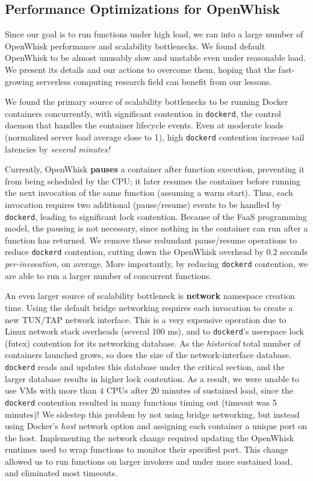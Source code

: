 \subsection{Performance Optimizations for OpenWhisk}

Since our goal is to run functions under high load, we ran into a large number of OpenWhisk performance and scalability bottlenecks.
We found default OpenWhisk to be almost unusably slow and unstable even under reasonable load. 
We present its details and our actions to overcome them, hoping that the fast-growing serverless computing research field can benefit from our lessons. 


We found the primary source of scalability bottlenecks to be running Docker containers concurrently,
with significant contention in \texttt{dockerd}, the control daemon that handles the container lifecycle events.
Even at moderate loads (normalized server load average close to 1), high \texttt{dockerd} contention increase tail latencies by \emph{several minutes!}


Currently, OpenWhisk \textbf{pauses} a container after function execution, preventing it from being scheduled by the CPU;
it later resumes the container before running the next invocation of the same function (assuming a warm start).
Thus, each invocation requires two additional (pause/resume) events to be handled by \texttt{dockerd}, leading to significant lock contention.
Because of the FaaS programming model, the pausing is not necessary, since nothing in the container can run after a function has returned.
We remove these redundant pause/resume operations to reduce \texttt{dockerd} contention, cutting down the OpenWhisk overhead by 0.2 seconds \emph{per-invocation}, on average.
More importantly, by reducing \texttt{dockerd} contention, we are able to run a larger number of concurrent functions. 

An even larger source of scalability bottleneck is \textbf{network} namespace creation time.
Using the default bridge networking requires each invocation to create a new TUN/TAP network interface.
This is a very expensive operation due to Linux network stack overheads (several 100 ms), and to \texttt{dockerd}'s userspace lock (futex) contention for its networking database. 
As the \emph{historical} total number of containers launched grows, so does the size of the network-interface database.
\texttt{dockerd} reads and updates this database under the critical section, and the larger database results in higher lock contention.
As a result, we were unable to use VMs with more than 4 CPUs after 20 minutes of sustained load, since the \texttt{dockerd} contention resulted in many functions timing out (timeout was 5 minutes)! 
We sidestep this problem by not using bridge networking, but instead using Docker's \textit{host} network option and assigning each container a unique port on the host. 
Implementing the network change required updating the OpenWhisk runtimes used to wrap functions to monitor their specified port.
This change allowed us to run functions on larger invokers and under more sustained load, and eliminated most timeouts. 

